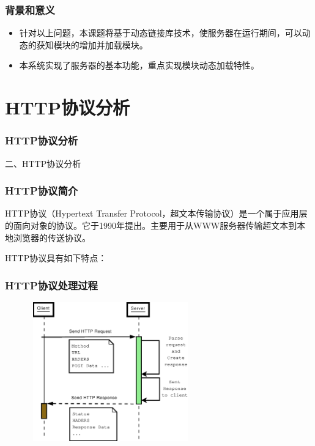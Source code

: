 \documentclass[10pt,dvipdfm]{beamer}
\begin{document}
\begin{frame}
	\frametitle{背景和意义}
	\begin{block}{}
	\begin{itemize}
		\item 针对以上问题，本课题将基于动态链接库技术，使服务器在运行期间，可以动态的获知模块的增加并加载模块。
		\item 本系统实现了服务器的基本功能，重点实现模块动态加载特性。
	\end{itemize}
	\end{block}
\end{frame}

\section{HTTP协议分析}

\begin{frame}
	\frametitle{HTTP协议分析}
	\begin{center}
	{\Large
		二、HTTP协议分析
	}
	\end{center}
\end{frame}

\begin{frame}
	\frametitle{HTTP协议简介}
	
HTTP协议（Hypertext Transfer Protocol，超文本传输协议）是一个属于应用层的面向对象的协议。它于1990年提出。主要用于从WWW服务器传输超文本到本地浏览器的传送协议。

 	\pause

\begin{block}{HTTP协议具有如下特点：}
\end{block}
\end{frame}

\begin{frame}
	\frametitle{HTTP协议处理过程}
	\begin{figure}[htbp]
	\centering
	\includegraphics[height=6cm, width=7cm]{pics/http.eps}
	\end{figure}
\end{frame}
\end{document}

